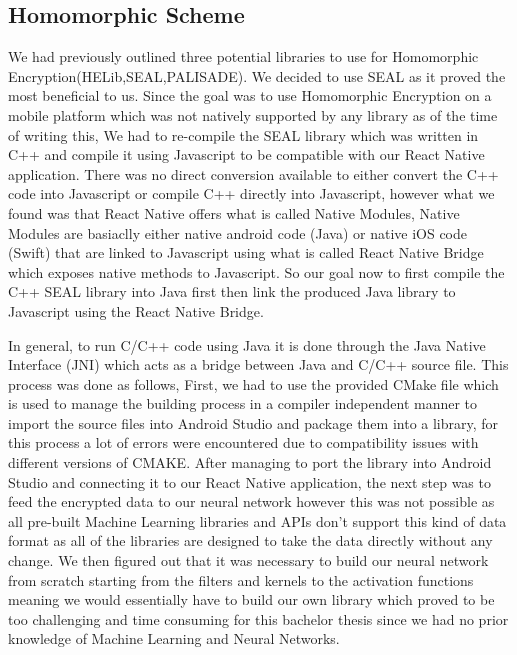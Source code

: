 \subsection{Homomorphic Scheme}
We had previously outlined three potential libraries to use for Homomorphic Encryption(HELib,SEAL,PALISADE). We decided to use SEAL as it proved the most beneficial to us.
Since the goal was to use Homomorphic Encryption on a mobile platform which was not natively supported by any library as of the time of writing this, We had to re-compile the SEAL library which was written in C++ and compile it using Javascript to be compatible with our React Native application.
There was no direct conversion available to either convert the C++ code into Javascript or compile C++ directly into Javascript, however what we found was that React Native offers what is called Native Modules, Native Modules are basiaclly either native android code (Java) or native iOS code (Swift) that are linked to Javascript using what is called React Native Bridge which exposes native methods to Javascript.
So our goal now to first compile the C++ SEAL library into Java first then link the produced Java library to Javascript using the React Native Bridge.\par

In general, to run C/C++ code using Java it is done through the Java Native Interface (JNI) which acts as a bridge between Java and C/C++ source file. This process was done as follows, First, we had to use the provided CMake file which is used to manage the building process in a compiler independent manner to import the source files into Android Studio and package them into a library, for this process a lot of errors were encountered due to compatibility issues with different versions of CMAKE.
After managing to port the library into Android Studio and connecting it to our React Native application, the next step was to feed the encrypted data to our neural network however this was not possible as all pre-built Machine Learning libraries and APIs don't support this kind of data format as all of the libraries are designed to take the data directly without any change. We then figured out that it was necessary to build our neural network from scratch starting from the filters and kernels to the activation functions meaning we would essentially have to build our own library which proved to be too challenging and time consuming for this bachelor thesis since we had no prior knowledge of Machine Learning
and Neural Networks.


